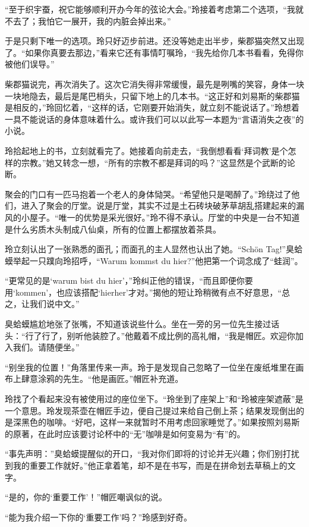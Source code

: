 “至于织宇蚕，祝它能够顺利开办今年的弦论大会。”玲接着考虑第二个选项，“我就不去了；我怕它一展开，我的内脏会掉出来。”

于是只剩下唯一的选项。玲只好迈步前进。还没等她走出半步，柴郡猫突然又出现了。“如果你真要去那边，”看来它还有事情叮嘱玲，“我先给你几本书看看，免得你被他们误导。”

柴郡猫说完，再次消失了。这次它消失得非常缓慢，最先是咧嘴的笑容，身体一块一块地隐去，最后是尾巴梢头，只留下地上的几本书。“这正好和刘易斯的柴郡猫是相反的，”玲回忆着，“这样的话，它刚要开始消失，就立刻不能说话了。”玲想着一具不能说话的身体意味着什么。或许我们可以以此写一本题为“言语消失之夜”的小说。

玲拾起地上的书，立刻就看完了。她接着向前走去，“我倒想看看‘拜词教’是个怎样的宗教。”她又转念一想，“所有的宗教不都是拜词的吗？”这显然是个武断的论断。

聚会的门口有一匹马抱着一个老人的身体恸哭。“希望他只是喝醉了。”玲绕过了他们，进入了聚会的厅堂。说是厅堂，其实不过是土石砖块破茅草胡乱搭建起来的漏风的小屋子。“唯一的优势是采光很好。”玲不得不承认。厅堂的中央是一台不知道是什么劣质木头制成八仙桌，所有的位置上都摆放着茶具。

玲立刻认出了一张熟悉的面孔；而面孔的主人显然也认出了她。“Schön Tag!”臭蛤蟆举起一只蹼向玲招呼，“Warum kommst du hier?”他把第一个词念成了“蛙润”。

“更常见的是‘warum bist du hier’，”玲纠正他的错误，“而且即便你要用‘kommen’，也应该搭配‘hierher’才对。”揭他的短让玲稍微有点不好意思，“总之，让我们说中文。”

臭蛤蟆尴尬地张了张嘴，不知道该说些什么。坐在一旁的另一位先生接过话头：“行了行了，别听他装腔了。”他戴着不成比例的高礼帽，“我是帽匠。欢迎你加入我们。请随便坐。”

“别坐我的位置！”角落里传来一声。玲于是发现自己忽略了一位坐在废纸堆里在画布上肆意涂鸦的先生。“他是画匠。”帽匠补充道。

玲找了个看起来没有被使用过的座位坐下。“玲坐到了座架上”和“玲被座架遮蔽”是一个意思。玲发现茶壶在帽匠手边，便自己提过来给自己倒上茶；结果发现倒出的是深黑色的咖啡。“好吧，这样一来就暂时不用考虑回家睡觉了。”如果按照刘易斯的原著，在此时应该要讨论杯中的“无”咖啡是如何变易为“有”的。

“事先声明：”臭蛤蟆提醒似的开口，“我对你们即将的讨论并无兴趣；你们别打扰到我的重要工作就好。”他正拿着笔，却不是在书写，而是在拼命划去草稿上的文字。

“是的，你的‘重要工作’！”帽匠嘲讽似的说。

“能为我介绍一下你的‘重要工作’吗？”玲感到好奇。

